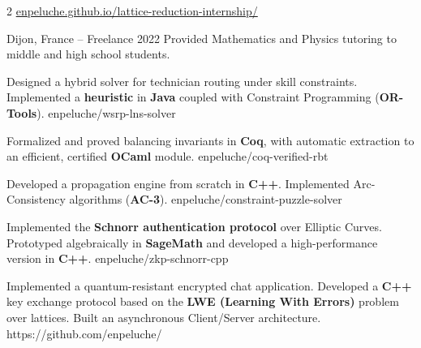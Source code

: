 \documentclass[10pt,a4paper,ragged2e,withhyper]{cv}
\newcommand{\kw}[1]{\textbf{\color{name}#1}}
\begin{document}
\begin{paracol}{2}
{    {\small \faGithub \color{accent}  \href{https://enpeluche.github.io/lattice-reduction-internship/}{enpeluche.github.io/lattice-reduction-internship/}}
  }

  \vfill
  {Dijon, France -- Freelance}
  {2022}
  {Provided Mathematics and Physics tutoring to middle and high school students.}

  \vfill


  \vfill

  {Designed a hybrid solver for technician routing under skill constraints. Implemented a \kw{heuristic} in \kw{Java} coupled with Constraint Programming (\kw{OR-Tools}).}
  {enpeluche/wsrp-lns-solver}

  \vfill

  {Formalized and proved balancing invariants in \kw{Coq}, with automatic extraction to an efficient, certified \kw{OCaml} module.}
  {enpeluche/coq-verified-rbt}

  \vfill

  {Developed a propagation engine from scratch in \kw{C++}. Implemented Arc-Consistency algorithms (\kw{AC-3}).}
  {enpeluche/constraint-puzzle-solver}

  \vfill

  {Implemented the \kw{Schnorr authentication protocol} over Elliptic Curves. Prototyped algebraically in \kw{SageMath} and developed a high-performance version in \kw{C++}.}
  {enpeluche/zkp-schnorr-cpp}

  \newpage

  {Implemented a quantum-resistant encrypted chat application. Developed a \kw{C++} key exchange protocol based on the \kw{LWE (Learning With Errors)} problem over lattices. Built an asynchronous Client/Server architecture.}
  {https://github.com/enpeluche/}

\end{paracol}
\end{document}
